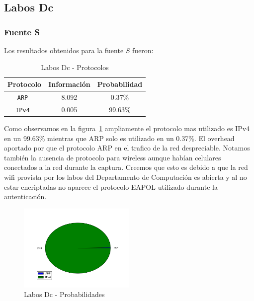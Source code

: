 \documentclass[final,inline,narroweqnarray,a4paper]{ieee}
\begin{document}
\subsection{Labos Dc}
\subsubsection{Fuente S}

Los resultados obtenidos para la fuente $S$ fueron:

\begin{table}[H]
    \begin{center}
        \begin{tabular}{|c|c|c|}
            \hline
            \textbf{Protocolo} & \textbf{Información} & \textbf{Probabilidad} \\ \hline
            \texttt{ARP       }& 8.092        & 0.37\%     \\ \hline
            \texttt{IPv4      }& 0.005        & 99.63\%    \\ \hline
        \end{tabular}
        \caption{Labos Dc - Protocolos}
        \label{table:labosDcS}
    \end{center}
\end{table} 

Como observamos en la figura~\ref{torta:labosDcS} ampliamente el protocolo mas utilizado es IPv4 en un 99.63\% mientras que ARP solo es utilizado en un 0.37\%. 
El overhead aportado por que el protocolo ARP en el trafico de la red despreciable.
Notamos también la ausencia de protocolo para wireless aunque habían celulares conectados a la red durante la captura. Creemos que esto es debido a que la red wifi provista por los labos del Departamento de Computación es abierta y al no estar encriptadas no aparece el protocolo EAPOL utilizado durante la autenticación. 

\begin{figure}[H]
    \begin{center}
        \includegraphics[width=0.5\textwidth]{plot/laboDcS-pie.png}
        \caption{Labos Dc - Probabilidades}
        \label{torta:labosDcS}
    \end{center}
\end{figure}
\end{document}
